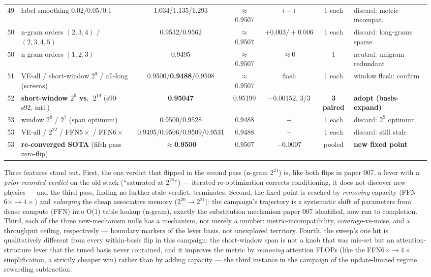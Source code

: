 \documentclass{article}
\begin{document}
\begin{table}[t]
\begin{center}
\begin{scriptsize}
\begin{tabular}{llccccl}
\midrule
49 & label smoothing $0.02/0.05/0.1$ & 1.034/1.135/1.293 & $\approx$0.9507 & $+$++ & 1 each & discard: metric-incompat.\ \\
50 & n-gram orders $(2,3,4)$ / $(2,3,4,5)$ & 0.9532/0.9562 & $\approx$0.9507 & $+0.003/+0.006$ & 1 each & discard: long-grams sparse \\
50 & n-gram orders $(1,2,3)$ & 0.9495 & $\approx$0.9507 & $\approx 0$ & 1 & neutral: unigram redundant \\
51 & VE-all / short-window $2^9$ / all-long (screens) & 0.9500/\textbf{0.9488}/0.9508 & $\approx$0.9507 & flash & 1 each & window flash: confirm \\
\midrule
52 & \textbf{short-window $2^9$ vs.\ $2^{10}$} (s90--s92, intl.) & \textbf{0.95047} & 0.95199 & $-0.00152$, 3/3 & \textbf{3 paired} & \textbf{adopt (basis-expand)} \\
53 & window $2^8$ / $2^7$ (span optimum) & 0.9500/0.9528 & 0.9488 & $+$ & 1 each & discard: $2^9$ optimum \\
53 & VE-all / $2^{22}$ / FFN$5\times$ / FFN$6\times$ & 0.9495/0.9506/0.9509/0.9531 & 0.9488 & $+$ & 1 each & discard: still stale \\
\midrule
53 & \textbf{re-converged SOTA} (fifth pass zero-flip) & \textbf{$\approx$0.9500} & 0.9507 & $-0.0007$ & pooled & \textbf{new fixed point} \\
\bottomrule
\end{tabular}
\end{scriptsize}
\end{center}
\vskip -0.1in
\end{table}

Three features stand out. First, the one verdict that flipped in the second pass (n-gram $2^{21}$) is, like both flips in paper 007, a lever with a \emph{prior recorded verdict} on the old stack (``saturated at $2^{20}$'') --- iterated re-optimization corrects conditioning, it does not discover new physics --- and the third pass, finding no further stale verdict, terminates. Second, the fixed point is reached by \emph{removing} capacity (FFN$6\times \rightarrow 4\times$) and \emph{enlarging} the cheap associative memory ($2^{20} \rightarrow 2^{21}$): the campaign's trajectory is a systematic shift of parameters from dense compute (FFN) into O(1) table lookup (n-gram), exactly the substitution mechanism paper 007 identified, now run to completion. Third, each of the three new-mechanism nulls has a mechanism, not merely a number: metric-incompatibility, coverage-vs-noise, and a throughput ceiling, respectively --- boundary markers of the lever basis, not unexplored territory. Fourth, the sweep's one hit is qualitatively different from every within-basis flip in this campaign: the short-window span is not a knob that was mis-set but an attention-structure lever that the tuned basis never contained, and it improves the metric by \emph{removing} attention FLOPs (like the FFN$6\times\rightarrow4\times$ simplification, a strictly cheaper win) rather than by adding capacity --- the third instance in the campaign of the update-limited regime rewarding subtraction.
\end{document}
